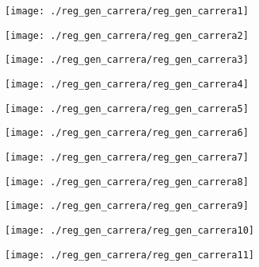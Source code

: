 \begin{figure}[!ht]
    \centering
    \texttt{[image: ./reg\_gen\_carrera/reg\_gen\_carrera1]}
\end{figure}
\clearpage

\begin{figure}[!ht]
    \centering
    \texttt{[image: ./reg\_gen\_carrera/reg\_gen\_carrera2]}
\end{figure}
\clearpage

\begin{figure}[!ht]
    \centering
    \texttt{[image: ./reg\_gen\_carrera/reg\_gen\_carrera3]}
\end{figure}
\clearpage

\begin{figure}[!ht]
    \centering
    \texttt{[image: ./reg\_gen\_carrera/reg\_gen\_carrera4]}
\end{figure}
\clearpage

\begin{figure}[!ht]
    \centering
    \texttt{[image: ./reg\_gen\_carrera/reg\_gen\_carrera5]}
\end{figure}
\clearpage

\begin{figure}[!ht]
    \centering
    \texttt{[image: ./reg\_gen\_carrera/reg\_gen\_carrera6]}
\end{figure}
\clearpage

\begin{figure}[!ht]
    \centering
    \texttt{[image: ./reg\_gen\_carrera/reg\_gen\_carrera7]}
\end{figure}
\clearpage

\begin{figure}[!ht]
    \centering
    \texttt{[image: ./reg\_gen\_carrera/reg\_gen\_carrera8]}
\end{figure}
\clearpage

\begin{figure}[!ht]
    \centering
    \texttt{[image: ./reg\_gen\_carrera/reg\_gen\_carrera9]}
\end{figure}
\clearpage

\begin{figure}[!ht]
    \centering
    \texttt{[image: ./reg\_gen\_carrera/reg\_gen\_carrera10]}
\end{figure}
\clearpage

\begin{figure}[!ht]
    \centering
    \texttt{[image: ./reg\_gen\_carrera/reg\_gen\_carrera11]}
\end{figure}
\clearpage

